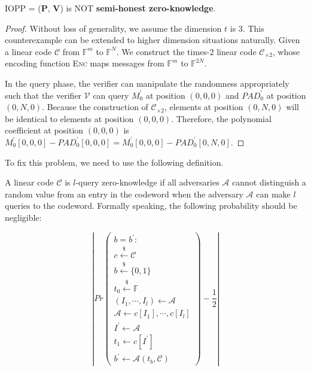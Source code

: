 \begin{lemma}
\label{lemma:szkpc-zk-cexample}

IOPP = ($\textbf{P}$, $\textbf{V}$) is NOT \textbf{semi-honest zero-knowledge}.

\end{lemma}
\begin{proof}

Without loss of generality, we assume the dimension $t$ is 3. This counterexample can be extended to higher dimension situations naturally. Given a linear code $\mathcal{C}$ from $\mathbb{F}^m$ to $\mathbb{F}^N$. We construct the times-2 linear code $\mathcal{C}_{\times 2}$, whose encoding function \textsc{Enc} maps messages from $\mathbb{F}^m$ to $\mathbb{F}^{2N}$.

In the query phase, the verifier can manipulate the randomness appropriately such that the verifier $\mathcal{V}$ can query $M_0^\prime$ at position $(0, 0, 0)$ and $PAD_0^\prime$ at position $(0, N, 0)$.
Because the construction of $\mathcal{C}_{\times 2}$, elements at position $(0, N, 0)$ will be identical to elements at position $(0, 0, 0)$. 
Therefore, the polynomial coefficient at position $(0, 0, 0)$ is $M_0^\prime[0, 0, 0] - PAD_0^\prime[0, 0, 0] = M_0^\prime[0, 0, 0] - PAD_0^\prime[0, N, 0]$.
\end{proof}









To fix this problem, we need to use the following definition.

\begin{definition}
A linear code $\mathcal{C}$ is $l$-query zero-knowledge if all adversaries $\mathcal{A}$ cannot distinguish a random value from an entry in the codeword when the adversary $\mathcal{A}$ can make $l$ queries to the codeword. Formally speaking, the following probability should be negligible:


$$
\left \lvert
Pr
\begin{pmatrix}
 b = b^\prime : \\
 c \overset{{\scriptscriptstyle\$}}{\leftarrow} \mathcal{C} \\
 b \overset{{\scriptscriptstyle\$}}{\leftarrow} \{0, 1\} \\
 t_0 \overset{{\scriptscriptstyle\$}}{\leftarrow} \mathbb{F} \\
 (I_1, \cdots, I_l) \leftarrow \mathcal{A} \\
 \mathcal{A} \leftarrow c[I_1], \cdots, c[I_l] \\
 I^\prime \leftarrow \mathcal{A} \\
 t_1 \leftarrow c[I^\prime] \\
 b^\prime \leftarrow \mathcal{A}(t_b, \mathcal{C})
\end{pmatrix}
- \frac{1}{2}
\right \rvert
$$
\end{definition}

